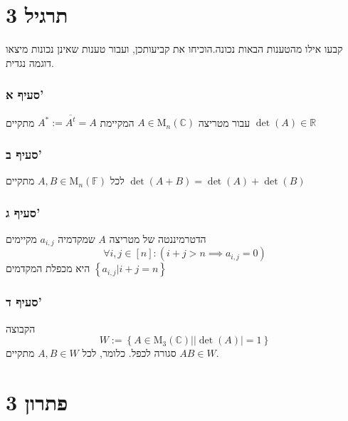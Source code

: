 \documentclass[12pt, titlepage]{article}
\begin{document}
\part*{תרגיל 3}
קבעו אילו מהטענות הבאות נכונה.הוכיחו את קביעותכן, ועבור טענות שאינן נכונות מיצאו דוגמה נגדית.
\section*{סעיף א'}
עבור מטריצה $A\in \mathrm{M}_n\left(\mathbb{C}\right)$ המקיימת $A^*:=\overline{A^t}=A$ מתקיים $\det\left(A\right)\in\mathbb{R}$
\section*{סעיף ב'}
לכל $A,B\in\mathrm{M}_n\left(\mathbb{F}\right)$ מתקיים $\det\left(A+B\right) =\det\left(A\right) + \det\left(B\right)$
\section*{סעיף ג'}
הדטרמיננטה של מטריצה $A$ שמקדמיה $a_{i,j}$ מקיימים
\[
    \forall i,j \in \left[n\right]: \left(i+j > n \implies a_{i,j} =0\right)
\]
היא מכפלת המקדמים $\left\{a_{i,j}|i+j=n\right\}$
\section*{סעיף ד'}
הקבוצה
\[
    W:=\left\{A\in\mathrm{M}_3\left(\mathbb{C}\right)|\left|\det\left(A\right)\right|=1\right\}
\]
סגורה לכפל. כלומר, לכל $A,B\in W$ מתקיים $AB \in W$.
\part*{פתרון 3}
\end{document}
